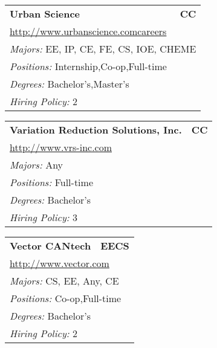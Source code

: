 \documentclass[twoside]{article}
\begin{document}
\begin{center}
\begin{multicols}{3}
\begin{FlushLeft}
\begin{minipage}{.9\columnwidth}
\end{minipage}
 
\begin{minipage}{.9\columnwidth}\begin{tabularx}{.95\columnwidth}{Xr}
                 {\Large\bf Urban Science} & {\Large\bf CC}\\
    \multicolumn{2}{p{.95\columnwidth}}{\url{http://www.urbanscience.comcareers}}\\
    \multicolumn{2}{p{.95\columnwidth}}{\emph{Majors:} EE, IP, CE, FE, CS, IOE, CHEME}\\
    \multicolumn{2}{p{.95\columnwidth}}{\emph{Positions:} Internship,Co-op,Full-time}\\
    \multicolumn{2}{p{.95\columnwidth}}{\emph{Degrees:} Bachelor's,Master's}\\
    \multicolumn{2}{p{.95\columnwidth}}{\emph{Hiring Policy:} 2}\\
    \end{tabularx}
    
\end{minipage}
 
\begin{minipage}{.9\columnwidth}\begin{tabularx}{.95\columnwidth}{Xr}
                 {\Large\bf Variation Reduction Solutions, Inc.} & {\Large\bf CC}\\
    \multicolumn{2}{p{.95\columnwidth}}{\url{http://www.vrs-inc.com}}\\
    \multicolumn{2}{p{.95\columnwidth}}{\emph{Majors:} Any}\\
    \multicolumn{2}{p{.95\columnwidth}}{\emph{Positions:} Full-time}\\
    \multicolumn{2}{p{.95\columnwidth}}{\emph{Degrees:} Bachelor's}\\
    \multicolumn{2}{p{.95\columnwidth}}{\emph{Hiring Policy:} 3}\\
    \end{tabularx}
    
\end{minipage}
 
\begin{minipage}{.9\columnwidth}\begin{tabularx}{.95\columnwidth}{Xr}
                 {\Large\bf Vector CANtech} & {\Large\bf EECS}\\
    \multicolumn{2}{p{.95\columnwidth}}{\url{http://www.vector.com}}\\
    \multicolumn{2}{p{.95\columnwidth}}{\emph{Majors:} CS, EE, Any, CE}\\
    \multicolumn{2}{p{.95\columnwidth}}{\emph{Positions:} Co-op,Full-time}\\
    \multicolumn{2}{p{.95\columnwidth}}{\emph{Degrees:} Bachelor's}\\
    \multicolumn{2}{p{.95\columnwidth}}{\emph{Hiring Policy:} 2}\\
    \end{tabularx}
    

\end{minipage}
\end{FlushLeft}
\end{multicols}
\end{center}
\end{document}
